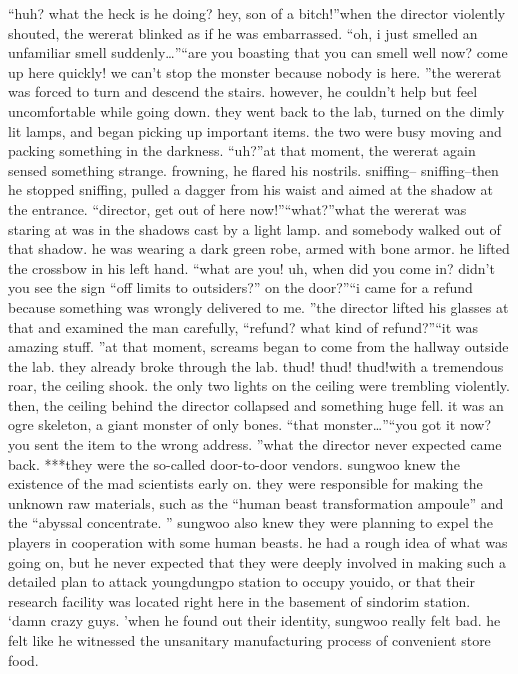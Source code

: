 “huh? what the heck is he doing? hey, son of a bitch!”when the director violently shouted, the wererat blinked as if he was embarrassed.
“oh, i just smelled an unfamiliar smell suddenly…”“are you boasting that you can smell well now? come up here quickly! we can’t stop the monster because nobody is here.
”the wererat was forced to turn and descend the stairs.
 however, he couldn’t help but feel uncomfortable while going down.
they went back to the lab, turned on the dimly lit lamps, and began picking up important items.
 the two were busy moving and packing something in the darkness.
“uh?”at that moment, the wererat again sensed something strange.
 frowning, he flared his nostrils.
sniffing– sniffing–then he stopped sniffing, pulled a dagger from his waist and aimed at the shadow at the entrance.
“director, get out of here now!”“what?”what the wererat was staring at was in the shadows cast by a light lamp.
and somebody walked out of that shadow.
 he was wearing a dark green robe, armed with bone armor.
 he lifted the crossbow in his left hand.
“what are you! uh, when did you come in? didn’t you see the sign “off limits to outsiders?” on the door?”“i came for a refund because something was wrongly delivered to me.
”the director lifted his glasses at that and examined the man carefully, “refund? what kind of refund?”“it was amazing stuff.
”at that moment, screams began to come from the hallway outside the lab.
they already broke through the lab.
thud! thud! thud!with a tremendous roar, the ceiling shook.
 the only two lights on the ceiling were trembling violently.
then, the ceiling behind the director collapsed and something huge fell.
it was an ogre skeleton, a giant monster of only bones.
“that monster…”“you got it now? you sent the item to the wrong address.
”what the director never expected came back.
***they were the so-called door-to-door vendors.
sungwoo knew the existence of the mad scientists early on.
they were responsible for making the unknown raw materials, such as the “human beast transformation ampoule” and the “abyssal concentrate.
” sungwoo also knew they were planning to expel the players in cooperation with some human beasts.
 he had a rough idea of what was going on, but he never expected that they were deeply involved in making such a detailed plan to attack youngdungpo station to occupy youido, or that their research facility was located right here in the basement of sindorim station.
‘damn crazy guys.
’when he found out their identity, sungwoo really felt bad.
 he felt like he witnessed the unsanitary manufacturing process of convenient store food.
